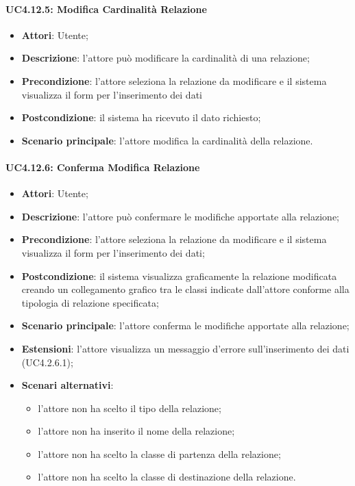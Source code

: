 \begin{itemize}
\begin{itemize}
\begin{itemize}
\begin{itemize}
\paragraph{UC4.12.5: Modifica Cardinalità Relazione}
\label{UC4.12.5}
\begin{itemize}
	\item \textbf{Attori}: Utente;
	\item \textbf{Descrizione}: l'attore può modificare la cardinalità di una relazione;
	\item \textbf{Precondizione}: l'attore seleziona la relazione da modificare e il sistema visualizza il form per l'inserimento dei dati
	\item \textbf{Postcondizione}: il sistema ha ricevuto il dato richiesto;
	\item \textbf{Scenario principale}: l'attore modifica la cardinalità della relazione.
\end{itemize}

\paragraph{UC4.12.6: Conferma Modifica Relazione}
\label{UC4.12.6}
\begin{itemize}
	\item \textbf{Attori}: Utente;
	\item \textbf{Descrizione}: l'attore può confermare le modifiche apportate alla relazione;
	\item \textbf{Precondizione}: l'attore seleziona la relazione da modificare e il sistema visualizza il form per l'inserimento dei dati;
	\item \textbf{Postcondizione}: il sistema visualizza graficamente la relazione modificata creando un collegamento grafico tra le classi indicate dall'attore conforme alla tipologia di relazione specificata;
	\item \textbf{Scenario principale}: l'attore conferma le modifiche apportate alla relazione;
	\item \textbf{Estensioni}: l'attore visualizza un messaggio d'errore sull'inserimento dei dati (UC4.2.6.1);
	\item \textbf{Scenari alternativi}:
	\begin{itemize}
		\item l'attore non ha scelto il tipo della relazione;
		\item l'attore non ha inserito il nome della relazione;
		\item l'attore non ha scelto la classe di partenza della relazione;
		\item l'attore non ha scelto la classe di destinazione della relazione.
	\end{itemize}
\end{itemize}


\end{itemize}
\end{itemize}
\end{itemize}
\end{itemize}
